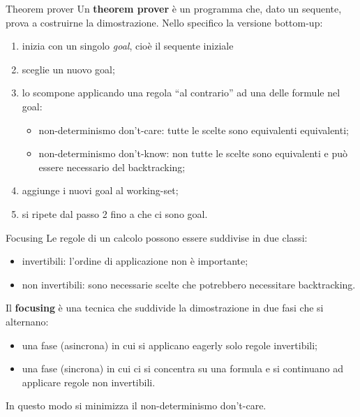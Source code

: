 \documentclass{beamer}
\begin{document}
\begin{frame}{Theorem prover}
	Un \textbf{theorem prover} è un programma che, dato un sequente, prova a costruirne la dimostrazione.
	Nello specifico la versione bottom-up:
	\begin{enumerate}
		\item inizia con un singolo \textit{goal}, cioè il sequente iniziale
		\item sceglie un nuovo goal;
		\item lo scompone applicando una regola ``al contrario'' ad una delle formule nel goal:
			\begin{itemize}
				\item non-determinismo don't-care: tutte le scelte sono equivalenti equivalenti;
				\item non-determinismo don't-know: non tutte le scelte sono equivalenti e può essere necessario del backtracking;
			\end{itemize}
		\item aggiunge i nuovi goal al working-set;
		\item si ripete dal passo 2 fino a che ci sono goal.
	\end{enumerate}
\end{frame}

\begin{frame}{Focusing}
	Le regole di un calcolo possono essere suddivise in due classi:
	\begin{itemize}
		\item invertibili: l'ordine di applicazione non è importante;
		\item non invertibili: sono necessarie scelte che potrebbero necessitare backtracking.
	\end{itemize}
	Il \textbf{focusing} è una tecnica che suddivide la dimostrazione in due fasi che si alternano:
	\begin{itemize}
		\item una fase (asincrona) in cui si applicano eagerly solo regole invertibili;
		\item una fase (sincrona) in cui ci si concentra su una formula e si continuano ad applicare regole non invertibili.
	\end{itemize}
	In questo modo si minimizza il non-determinismo don't-care.
\end{frame}
\end{document}
